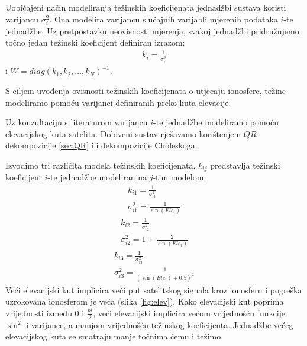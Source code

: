 \documentclass[a4paper,twoside,12pt]{memoir} %
\begin{document}
Uobičajeni način modeliranja težinskih koeficijenata jednadžbi sustava koristi varijancu $\sigma^2_i$. Ona modelira varijancu slučajnih varijabli mjerenih podataka $i$-te jednadžbe.
Uz pretpostavku neovisnosti mjerenja, svakoj jednadžbi pridružujemo točno jedan težinski koeficijent
definiran izrazom:
\begin{align}
k_i = \frac{1}{\sigma^2_i}
\end{align}
i $W = diag(k_1, k_2, \hdots ,k_N)^{-1}$.

S ciljem uvođenja ovisnosti težinskih koeficijenata o utjecaju ionosfere, 
težine modeliramo pomoću varijanci definiranih preko kuta elevacije.

Uz konzultaciju s literaturom \cite{ref:13,ref:34,ref:4,ref:45,ref:25,LSA:weights} varijancu $i$-te jednadžbe modeliramo pomoću elevacijskog kuta satelita. 
Dobiveni sustav rješavamo korištenjem $QR$ dekompozicije \ref{sec:QR} ili dekompozicije Choleskoga.

Izvodimo tri različita modela težinskih koeficijenata. $k_{ij}$ predstavlja težinski koeficijent $i$-te jednadžbe modeliran na $j$-tim modelom.
\begin{align}\label{eq:elevationTezine1}
k_{i1} = \frac{1}{\sigma^2_{i1}} \\
\sigma^2_{i1} = \frac{1}{ \sin ( Ele_i ) }%
\end{align}
\begin{align}\label{eq:elevationTezine2}
k_{i2} = \frac{1}{\sigma^2_{i2}} \\
\sigma^2_{i2} = 1 + \frac{2}{ \sin ( Ele_i ) }%
\end{align}
\begin{align}\label{eq:elevationTezine3}
k_{i3} = \frac{1}{\sigma^2_{i3}} \\
\sigma^2_{i3} = \frac{1}{ (\sin ( Ele_i) + 0.5)^2 }%
\end{align}
Veći elevacijski kut implicira veći put satelitskog signala kroz ionosferu i pogreška
uzrokovana ionosferom je veća (slika \ref{fig:elev}). Kako elevacijski kut poprima vrijednosti između 0 i $\frac{pi}{2}$, veći elevacijski implicira većom vrijednošću funkcije $\sin^2$ i 
varijance, a manjom vrijednošću težinskog koeficijenta.
Jednadžbe većeg elevacijskog kuta se smatraju manje točnima čemu i težimo.
\end{document}
